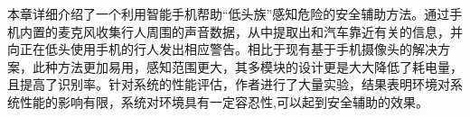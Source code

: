 本章详细介绍了一个利用智能手机帮助“低头族”感知危险的安全辅助方法。通过手机内置的麦克风收集行人周围的声音数据，从中提取出和汽车靠近有关的信息，并向正在低头使用手机的行人发出相应警告。相比于现有基于手机摄像头的解决方案，此种方法更加易用，感知范围更大，其多模块的设计更是大大降低了耗电量，且提高了识别率。针对系统的性能评估，作者进行了大量实验，结果表明环境对系统性能的影响有限，系统对环境具有一定容忍性,可以起到安全辅助的效果。











